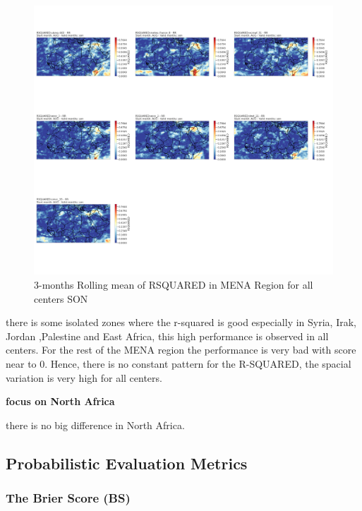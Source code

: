 \begin{figure}[H]
\includegraphics[scale=0.3]{plots/det/rsquared/rsquared_son_RR.png}
\caption{3-months Rolling mean of RSQUARED in MENA Region for all centers SON}
\end{figure}

there is some isolated zones where the r-squared is good especially in Syria, Irak, Jordan ,Palestine  and East Africa, this high performance is observed in all centers. For the rest of the MENA region the performance is very bad with score near to 0. Hence, there is no constant pattern for the R-SQUARED, the spacial variation is very high for all centers.

\vspace{1.5cm}
\textbf{focus on North Africa}

there is no big difference in North Africa.


\subsection{Probabilistic Evaluation Metrics}

\subsubsection{The Brier Score (BS)}

